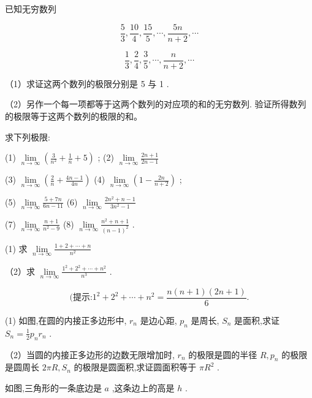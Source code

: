 \documentclass[lang=cn,newtx,10pt,scheme=chinese]{elegantbook}
\begin{document}
\begin{problemset}[习题一]
	\item 已知无穷数列
	
	\[
	\frac{5}{3},\frac{10}{4},\frac{15}{5},\cdots ,\frac{5n}{n + 2},\cdots
	\]
	
	\[
	\frac{1}{3},\frac{2}{4},\frac{3}{5},\cdots ,\frac{n}{n + 2},\cdots
	\]
	
	（1）求证这两个数列的极限分别是 5 与 1 .
	
	（2）另作一个每一项都等于这两个数列的对应项的和的无穷数列. 验证所得数列的极限等于这两个数列的极限的和。
	
	\item 求下列极限:
	
	(1) \(\mathop{\lim }\limits_{{n \rightarrow \infty }}\left( {\frac{3}{{n}^{2}} + \frac{1}{n} + 5}\right)\) ; (2) \(\mathop{\lim }\limits_{{n \rightarrow \infty }}\frac{{2n} + 1}{{2n} - 1}\)
	
	(3) \(\mathop{\lim }\limits_{{n \rightarrow \infty }}\left( {\frac{2}{n} + \frac{{4n} - 1}{4n}}\right)\) (4) \(\mathop{\lim }\limits_{{n \rightarrow \infty }}\left( {1 - \frac{2n}{n + 2}}\right)\) ;
	
	(5) \(\mathop{\lim }\limits_{{n \rightarrow \infty }}\frac{5 + {7n}}{{6n} - {11}}\) (6) \(\mathop{\lim }\limits_{{n \rightarrow \infty }}\frac{2{n}^{2} + n - 1}{3{n}^{2} - 1}\)
	
	(7) \(\mathop{\lim }\limits_{{n \rightarrow \infty }}\frac{n + 1}{{n}^{2} - 9}\) (8) \(\mathop{\lim }\limits_{{n \rightarrow \infty }}\frac{{n}^{2} + n + 1}{{\left( n - 1\right) }^{2}}\) .
	
	\item (1) 求 \(\mathop{\lim }\limits_{{n \rightarrow \infty }}\frac{1 + 2 + \cdots + n}{{n}^{2}}\)
	
	（2）求 \(\mathop{\lim }\limits_{{n \rightarrow \infty }}\frac{{1}^{2} + {2}^{2} + \cdots + {n}^{2}}{{n}^{3}}\) .
	
	\[
	\text{(提示:}{1}^{2} + {2}^{2} + \cdots + {n}^{2} = \frac{n\left( {n + 1}\right) \left( {{2n} + 1}\right) }{6}\text{.}
	\]
	
	\item (1) 如图,在圆的内接正多边形中, \({r}_{n}\) 是边心距, \({p}_{n}\) 是周长, \({S}_{n}\) 是面积,求证 \({S}_{n} = \frac{1}{2}{p}_{n}{r}_{n}\) .
	
	（2）当圆的内接正多边形的边数无限增加时, \({r}_{n}\) 的极限是圆的半径 \(R,{p}_{n}\) 的极限是圆周长 \({2\pi R},{S}_{n}\) 的极限是圆面积,求证圆面积等于 \(\pi {R}^{2}\) .
	
	\item 如图,三角形的一条底边是 \(a\) ,这条边上的高是 \(h\) .
	

\end{problemset}
\end{document}

